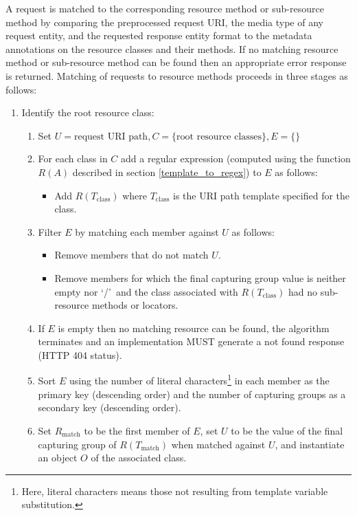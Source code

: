 A request is matched to the corresponding resource method or sub-resource method by comparing the preprocessed request URI, the media type of any request entity, and the requested response entity format to the metadata annotations on the resource classes and their methods. If no matching resource method or sub-resource method can be found then an appropriate error response is returned. Matching of requests to resource methods proceeds in three stages as follows:

\begin{enumerate}
\item Identify the root resource class:

\begin{enumerate}
\item Set $U=\mbox{request URI path}, C=\{\mbox{root resource classes}\}, E=\{\}$

\item For each class in $C$ add a regular expression (computed using the function $R(A)$ described in section \ref{template_to_regex}) to $E$ as follows:
\begin{itemize}
\item Add $R(T_{\mbox{class}})$ where $T_{\mbox{class}}$ is the URI path template specified for the class.
\end{itemize}

\item Filter $E$ by matching each member against $U$ as follows:
\begin{itemize}
\item Remove members that do not match $U$.
\item Remove members for which the final capturing group value is neither empty nor \lq/\rq\ and the class associated with $R(T_{\mbox{class}})$ had no sub-resource methods or locators.
\end{itemize}

\item If $E$ is empty then no matching resource can be found, the algorithm terminates and an implementation MUST generate a not found response (HTTP 404 status).

\item Sort $E$ using the number of literal characters\footnote{Here, literal characters means those not resulting from template variable substitution.} in each member as the primary key (descending order) and the number of capturing groups as a secondary key (descending order).

\item Set $R_{\mbox{match}}$ to be the first member of $E$, set $U$ to be the value of the final capturing group of $R(T_{\mbox{match}})$ when matched against $U$, and instantiate an object $O$ of the associated class.


\end{enumerate}
\end{enumerate}
